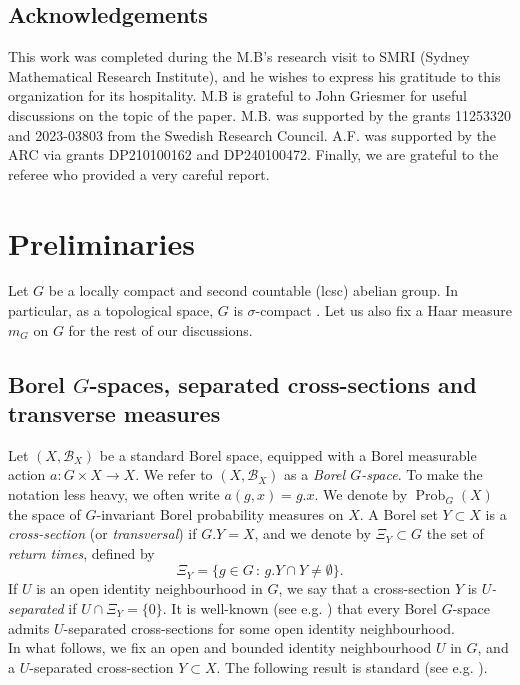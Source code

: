 \documentclass[12pt,reqno,a4paper]{amsart}
\numberwithin{equation}{section}
\newcommand{\ra}{\rightarrow}
\DeclareMathOperator{\Prob}{Prob}
\theoremstyle{theorem}
\theoremstyle{task}
\theoremstyle{definition}
\begin{document}
\subsection{Acknowledgements}

This work was completed during the M.B's research visit to SMRI (Sydney Mathematical Research Institute), and he wishes to express his gratitude to this organization for its hospitality. M.B is grateful to John Griesmer for useful discussions on the topic of the paper. M.B. was supported by the grants 11253320 and 2023-03803 from the Swedish Research Council. A.F. was supported by the ARC via grants DP210100162 and DP240100472.
Finally, we are grateful to the referee who provided a very careful report. 

\section{Preliminaries}
\label{sec:Prel}

Let $G$ be a locally compact and second countable (lcsc) abelian group. In particular, as a topological space, $G$ is $\sigma$-compact \cite[Theorem 2.B.4]{CornHarpe}. Let us also fix a Haar measure $m_G$ on $G$ for the rest of our discussions. 

\subsection{Borel $G$-spaces, separated cross-sections and transverse measures}
\label{subsec:cross}

Let $(X,\mathscr{B}_X)$ be a standard Borel space, equipped with a Borel measurable action $a : G \times X \ra X$. We refer to $(X,\mathscr{B}_X)$ as a \emph{Borel $G$-space}. To make the notation less heavy, we often write $a(g,x) = g.x$. We denote by $\Prob_G(X)$ the space of $G$-invariant Borel probability measures on $X$. A Borel set $Y \subset X$ is a \emph{cross-section} (or \emph{transversal}) if $G.Y = X$, and we denote by $\Xi_Y \subset G$ the set of \emph{return times}, defined by
\[
\Xi_Y = \{ g \in G \, : \, g.Y \cap Y \neq \emptyset \}.
\]
If $U$ is an open identity neighbourhood in $G$, we say that a cross-section 
$Y$ is \emph{$U$-separated} if $U \cap \Xi_Y = \{0\}$. It is well-known (see e.g. \cite[Theorem 2.4]{Slutsky}) that every Borel $G$-space admits $U$-separated cross-sections for some open identity neighbourhood. \\

In what follows, we fix an open and bounded identity neighbourhood $U$ in $G$, and 
a $U$-separated cross-section $Y \subset X$. The following result is standard (see e.g. \cite[Proposition 4.3]{BHK}).
\end{document}
